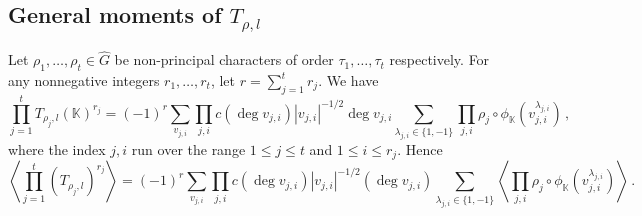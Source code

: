 \documentclass[12pt]{amsart}
\theoremstyle{plain}
\begin{document}
\subsection{General moments of $T_{\rho,l}$}
Let $\rho_1,\ldots,\rho_t \in \widehat{G}$ be non-principal characters of order $\tau_1,\ldots,\tau_t$ respectively. For any nonnegative integers $r_1, \ldots, r_t$, let $r=\sum_{j=1}^t r_j$. We have
\[\prod_{j=1}^t T_{\rho_j,l}({{\mathbb K}})^{r_j}=(-1)^{r}\sum_{v_{j,i}} \prod_{j,i}c\left(\deg v_{j,i}\right)|v_{j,i}|^{-1/2}\deg v_{j,i} \sum_{\lambda_{j,i} \in \{1,-1\}}\prod_{j,i} \rho_j \circ {\phi_{{\mathbb K}}}\left(v_{j,i}^{\lambda_{j,i}} \right)\,,\]
where the index $j,i$ run over the range $1 \le j \le t$ and $1 \le i \le r_j$. Hence
\[\left\langle \prod_{j=1}^t \left(T_{\rho_j,l}\right)^{r_j} \right\rangle = (-1)^r \sum_{v_{j,i}} \prod_{j,i}c\left(\deg v_{j,i}\right)|v_{j,i}|^{-1/2}(\deg v_{j,i}) \sum_{\lambda_{j,i} \in \{1,-1\}}\left\langle \prod_{j,i} \rho_j \circ {\phi_{{\mathbb K}}}\left(v_{j,i}^{\lambda_{j,i}} \right) \right \rangle \,. \]
\end{document}
